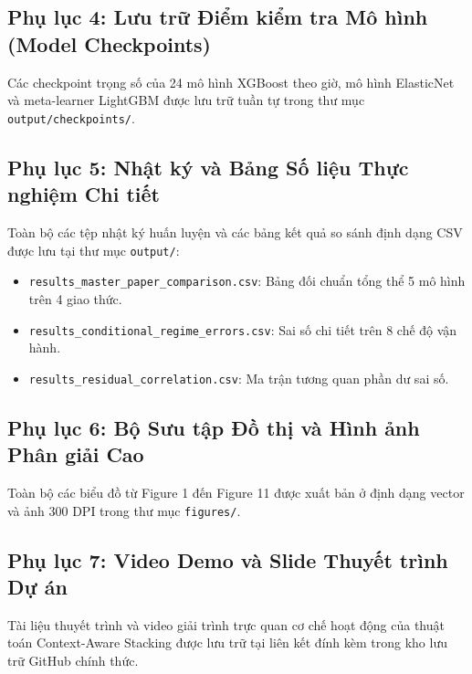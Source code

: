 \documentclass[12pt]{ai_conquer2026}
\begin{document}
\subsection*{Phụ lục 4: Lưu trữ Điểm kiểm tra Mô hình (Model Checkpoints)}
Các checkpoint trọng số của 24 mô hình XGBoost theo giờ, mô hình ElasticNet và meta-learner LightGBM được lưu trữ tuần tự trong thư mục \texttt{output/checkpoints/}.

\subsection*{Phụ lục 5: Nhật ký và Bảng Số liệu Thực nghiệm Chi tiết}
Toàn bộ các tệp nhật ký huấn luyện và các bảng kết quả so sánh định dạng CSV được lưu tại thư mục \texttt{output/}:
\begin{itemize}
    \item \texttt{results\_master\_paper\_comparison.csv}: Bảng đối chuẩn tổng thể 5 mô hình trên 4 giao thức.
    \item \texttt{results\_conditional\_regime_errors.csv}: Sai số chi tiết trên 8 chế độ vận hành.
    \item \texttt{results\_residual_correlation.csv}: Ma trận tương quan phần dư sai số.
\end{itemize}

\subsection*{Phụ lục 6: Bộ Sưu tập Đồ thị và Hình ảnh Phân giải Cao}
Toàn bộ các biểu đồ từ Figure 1 đến Figure 11 được xuất bản ở định dạng vector và ảnh 300 DPI trong thư mục \texttt{figures/}.

\subsection*{Phụ lục 7: Video Demo và Slide Thuyết trình Dự án}
Tài liệu thuyết trình và video giải trình trực quan cơ chế hoạt động của thuật toán Context-Aware Stacking được lưu trữ tại liên kết đính kèm trong kho lưu trữ GitHub chính thức.
\end{document}
